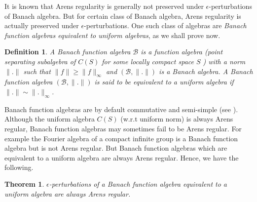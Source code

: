 \documentclass[pdflatex,sn-mathphys-num]{sn-jnl}%
\newtheorem{definition}{Definition}
\theoremstyle{thmstyleone}%
\newtheorem{theorem}{Theorem}%
\theoremstyle{thmstyletwo}%
\theoremstyle{thmstylethree}%
\begin{document}
It is known that Arens regularity is generally not preserved under $\epsilon$-perturbations of Banach algebra. But for certain class of Banach algebra, Arens regularity is actually preserved under $\epsilon$-perturbations. One such class of algebras are \emph{Banach function algebras equivalent to uniform algebras}, as we shall prove now.
\begin{definition} \cite[Def. 3.1.2]{Dales}
	A Banach function algebra $\mathcal B$ is a function algebra (point separating subalgebra of $C(S)$ for some locally compact space $S$ ) with a norm $\|.\|$ such that $\|f\|\geq \|f\|_\infty$  and $(\mathcal B, \|.\|)$ is a Banach algebra.  A Banach function algebra $(\mathcal B,\|.\|)$ is said to be equivalent to a uniform algebra if $\|.\|\sim \|.\|_\infty$.
\end{definition}
Banach function algebras are by default commutative and semi-simple (see \cite[Definition 3.1.2]{Dales}). Although the uniform algebra $C(S)$ (w.r.t uniform norm) is always Arens regular, Banach function algebras may sometimes fail to be Arens regular. For example the Fourier algebra of a compact infinite group is a Banach function algebra but is not Arens regular. But Banach function algebras which are equivalent to a uniform algebra are always Arens regular. Hence, we have the following.
\begin{theorem}\label{BFAU}
	$\epsilon$-perturbations of a Banach function algebra equivalent to a uniform algebra are always Arens regular.
\end{theorem}
\end{document}
